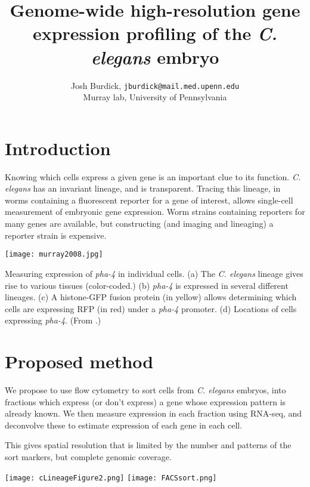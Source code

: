 \documentclass[landscape,a0]{a0poster}
\begin{document}
\thispagestyle{empty}

\title{Genome-wide high-resolution gene expression profiling of the {\em C. elegans} embryo}

\author{Josh Burdick, {\tt jburdick@mail.med.upenn.edu} \\
Murray lab, University of Pennsylvania}
\date{}

\maketitle
\begin{multicols}{4}
\section*{Introduction}
Knowing which cells express a given gene is an important clue to its function.
{\em C. elegans} has an invariant lineage, and is transparent.
Tracing this lineage, in worms containing a fluorescent reporter for a
gene of interest,
allows
single-cell measurement of embryonic gene expression.
Worm strains containing reporters for many genes are available,
but constructing (and imaging and lineaging) a reporter strain is expensive.

\texttt{[image: murray2008.jpg]}

{\small
Measuring expression of {\em pha-4} in individual cells.
(a) The {\em C. elegans} lineage gives rise to various tissues
(color-coded.)
(b) {\em pha-4} is expressed in several different lineages.
(c) A histone-GFP fusion protein (in yellow) allows
determining which cells are expressing RFP (in red)
under a {\em pha-4} promoter. (d) Locations of cells expressing {\em pha-4}.
(From \cite{pmid18587405}.)}

\section*{Proposed method}

We propose to use flow cytometry to sort cells from {\em C. elegans}
embryos, into fractions which
express (or don't express) a gene whose expression pattern is already known.
We then measure expression in
each fraction using RNA-seq, and deconvolve these to estimate expression of each
gene in each cell.

This gives spatial resolution that is limited by the number and
patterns of the sort markers, but complete genomic coverage.

\begin{center}
\texttt{[image: cLineageFigure2.png]}
\texttt{[image: FACSsort.png]}
\end{center}


\end{multicols}
\end{document}
